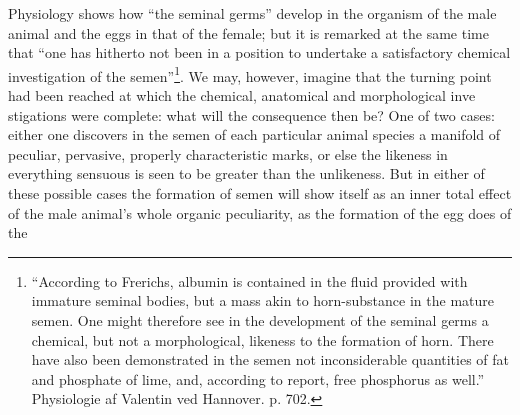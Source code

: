 \documentclass[12pt,a4paper]{book}
\begin{document}
Physiology shows how ``the seminal germs'' develop in the organism of the male
animal and the eggs in that of the female; but it is remarked at the same time
that ``one has hitherto not been in a position to undertake a satisfactory
chemical investigation of the semen''\footnote{``According to Frerichs, albumin
is contained in the fluid provided with immature seminal bodies, but a mass akin
to horn-substance in the mature semen. One might therefore see in the
development of the seminal germs a chemical, but not a morphological, likeness
to the formation of horn. There have also been demonstrated in the semen not
inconsiderable quantities of fat and phosphate of lime, and, according to
report, free phosphorus as well.'' Physiologie af Valentin ved Hannover.
p. 702.}. We may, however, imagine that the turning point had been reached at
which the chemical, anatomical and morphological inve%
\setcounter{footnote}{0}%
stigations were complete:
what will the consequence then be? One of two cases: either one discovers in the
semen of each particular animal species a manifold of peculiar, pervasive,
properly characteristic marks, or else the likeness in everything sensuous is
seen to be greater than the unlikeness. But in either of these possible cases
the formation of semen will show itself as an inner total effect of the male
animal's whole organic peculiarity, as the formation of the egg does of the
\end{document}
